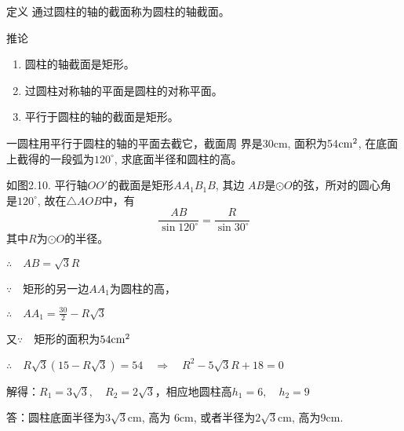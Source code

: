 \begin{blk}{定义}
    通过圆柱的轴的截面称为圆柱的轴截面。
\end{blk}

\begin{blk}{推论}
\begin{enumerate}
    \item 圆柱的轴截面是矩形。
    \item 过圆柱对称轴的平面是圆柱的对称平面。
    \item 平行于圆柱的轴的截面是矩形。
\end{enumerate}
\end{blk}

\begin{example}
    一圆柱用平行于圆柱的轴的平面去截它，截面周
界是30cm, 面积为54${\rm cm}^2$, 在底面上截得的一段弧为$120^{\circ}$, 求底面半径和圆柱的高。
\end{example}

\begin{figure}[htp]
    \centering
{}
    \caption{}
\end{figure}

\begin{solution}
    如图2.10. 平行轴$OO'$的截面是矩形$AA_1B_1B$, 其边
$AB$是$\odot O$的弦，所对的圆心角是$120^{\circ}$, 故在$\triangle AOB$中，有
\[\frac{AB}{\sin 120^{\circ}}=\frac{R}{\sin 30^{\circ}}\]
其中$R$为$\odot O$的半径。

$\therefore\quad AB=\sqrt{3}R$

$\because\quad $矩形的另一边$AA_1$为圆柱的高，

$\therefore\quad AA_1=\frac{30}{2}-R\sqrt{3}$

又$\because\quad $矩形的面积为$54{\rm cm^2}$

$\therefore\quad R\sqrt{3}\left(15-R\sqrt{3}\right)=54 \quad \Rightarrow\quad R^2-5\sqrt{3}R+18=0$

解得：$R_1=3\sqrt{3},\quad R_2=2\sqrt{3}$，相应地圆柱高$h_1=6,\quad h_2=9$

答：圆柱底面半径为$3\sqrt{3}$cm, 高为
6cm, 或者半径为$2\sqrt{3}$cm, 高为9cm.
\end{solution}


